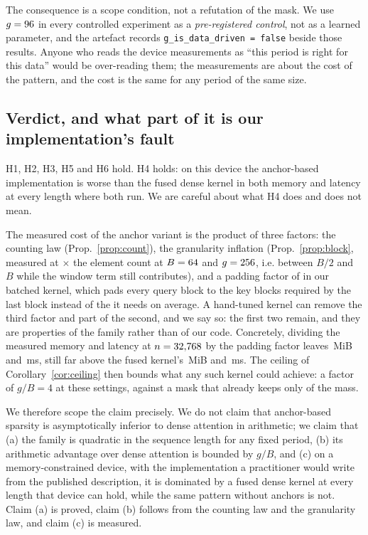 The consequence is a scope condition, not a refutation of the mask. We use
$g=96$ in every controlled experiment as a \emph{pre-registered control},
not as a learned parameter, and the artefact records
\texttt{g\_is\_data\_driven = false} beside those results. Anyone who reads the
device measurements as ``this period is right for this data'' would be
over-reading them; the measurements are about the cost of the pattern, and the
cost is the same for any period of the same size.

\subsection{Verdict, and what part of it is our implementation's fault}\label{sec:attn_disclose}

H1, H2, H3, H5 and H6 hold. H4 holds: on this device the anchor-based
implementation is worse than the fused dense kernel in both memory and latency at
every length where both run. We are careful about what H4 does and does not mean.

The measured cost of the anchor variant is the product of three factors: the
counting law (Prop.~\ref{prop:count}), the granularity inflation
(Prop.~\ref{prop:block}, measured at \BlockWorkInflation{}$\times$ the element
count at $B=64$ and $g=256$, i.e. between $B/2$ and $B$ while the window
term still contributes), and a padding factor of \PadFactor{} in our
batched kernel, which pads every query block to the
\MaxSelBlocks{} key blocks required by the last block instead of the
\MeanSelBlocks{} it needs on average. A hand-tuned kernel can remove the third
factor and part of the second, and we say so: the first two remain, and they are
properties of the family rather than of our code. Concretely, dividing the
measured memory and latency at $n=32{,}768$ by the padding factor leaves
\VramAfterDepad\,MiB and \LatAfterDepad\,ms, still far above the fused kernel's
\VramSdpaBig\,MiB and \LatSdpaBig\,ms. The ceiling of Corollary~\ref{cor:ceiling}
then bounds what any such kernel could achieve: a factor of $g/B=4$ at these
settings, against a mask that already keeps only \RhoMean{} of the mass.

We therefore scope the claim precisely. We do not claim that anchor-based sparsity
is asymptotically inferior to dense attention in arithmetic; we claim that (a) the
family is quadratic in the sequence length for any fixed period, (b) its arithmetic
advantage over dense attention is bounded by $g/B$, and (c) on a memory-constrained
device, with the implementation a practitioner would write from the published
description, it is dominated by a fused dense kernel at every length that device
can hold, while the same pattern without anchors is not. Claim (a) is proved,
claim (b) follows from the counting law and the granularity law, and claim (c) is
measured.

